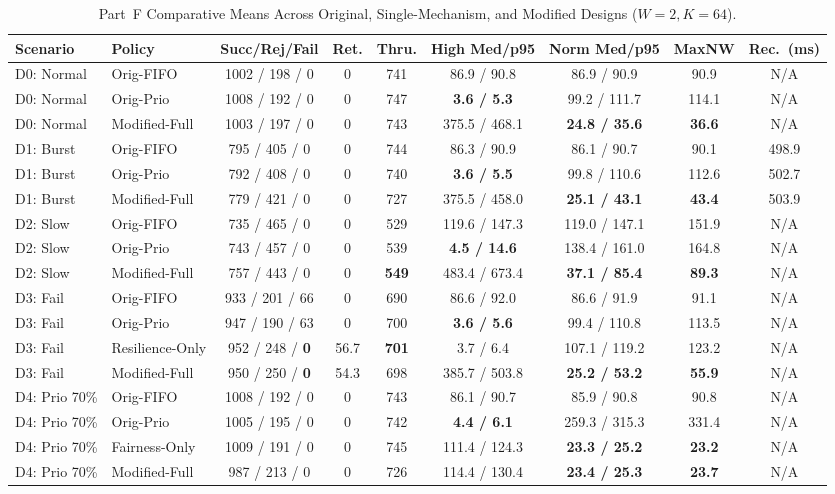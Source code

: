 \documentclass[11pt]{article}
\begin{document}
\begin{table}[htbp]
\centering
\caption{Part~F Comparative Means Across Original, Single-Mechanism, and Modified Designs ($W=2, K=64$).}
\scriptsize
\setlength{\tabcolsep}{3.0pt}
\begin{tabular}{@{}llccccccc@{}}
\toprule
\textbf{Scenario} & \textbf{Policy} & \textbf{Succ/Rej/Fail} & \textbf{Ret.} & \textbf{Thru.} & \textbf{High Med/p95} & \textbf{Norm Med/p95} & \textbf{MaxNW} & \textbf{Rec.\ (ms)} \\
\midrule
D0: Normal & Orig-FIFO & 1002 / 198 / 0 & 0 & 741 & 86.9 / 90.8 & 86.9 / 90.9 & 90.9 & N/A \\
D0: Normal & Orig-Prio & 1008 / 192 / 0 & 0 & 747 & \textbf{3.6 / 5.3} & 99.2 / 111.7 & 114.1 & N/A \\
D0: Normal & Modified-Full & 1003 / 197 / 0 & 0 & 743 & 375.5 / 468.1 & \textbf{24.8 / 35.6} & \textbf{36.6} & N/A \\
\midrule
D1: Burst & Orig-FIFO & 795 / 405 / 0 & 0 & 744 & 86.3 / 90.9 & 86.1 / 90.7 & 90.1 & 498.9 \\
D1: Burst & Orig-Prio & 792 / 408 / 0 & 0 & 740 & \textbf{3.6 / 5.5} & 99.8 / 110.6 & 112.6 & 502.7 \\
D1: Burst & Modified-Full & 779 / 421 / 0 & 0 & 727 & 375.5 / 458.0 & \textbf{25.1 / 43.1} & \textbf{43.4} & 503.9 \\
\midrule
D2: Slow & Orig-FIFO & 735 / 465 / 0 & 0 & 529 & 119.6 / 147.3 & 119.0 / 147.1 & 151.9 & N/A \\
D2: Slow & Orig-Prio & 743 / 457 / 0 & 0 & 539 & \textbf{4.5 / 14.6} & 138.4 / 161.0 & 164.8 & N/A \\
D2: Slow & Modified-Full & 757 / 443 / 0 & 0 & \textbf{549} & 483.4 / 673.4 & \textbf{37.1 / 85.4} & \textbf{89.3} & N/A \\
\midrule
D3: Fail & Orig-FIFO & 933 / 201 / 66 & 0 & 690 & 86.6 / 92.0 & 86.6 / 91.9 & 91.1 & N/A \\
D3: Fail & Orig-Prio & 947 / 190 / 63 & 0 & 700 & \textbf{3.6 / 5.6} & 99.4 / 110.8 & 113.5 & N/A \\
D3: Fail & Resilience-Only & 952 / 248 / \textbf{0} & 56.7 & \textbf{701} & 3.7 / 6.4 & 107.1 / 119.2 & 123.2 & N/A \\
D3: Fail & Modified-Full & 950 / 250 / \textbf{0} & 54.3 & 698 & 385.7 / 503.8 & \textbf{25.2 / 53.2} & \textbf{55.9} & N/A \\
\midrule
D4: Prio 70\% & Orig-FIFO & 1008 / 192 / 0 & 0 & 743 & 86.1 / 90.7 & 85.9 / 90.8 & 90.8 & N/A \\
D4: Prio 70\% & Orig-Prio & 1005 / 195 / 0 & 0 & 742 & \textbf{4.4 / 6.1} & 259.3 / 315.3 & 331.4 & N/A \\
D4: Prio 70\% & Fairness-Only & 1009 / 191 / 0 & 0 & 745 & 111.4 / 124.3 & \textbf{23.3 / 25.2} & \textbf{23.2} & N/A \\
D4: Prio 70\% & Modified-Full & 987 / 213 / 0 & 0 & 726 & 114.4 / 130.4 & \textbf{23.4 / 25.3} & \textbf{23.7} & N/A \\
\bottomrule
\end{tabular}
\end{table}
\end{document}
